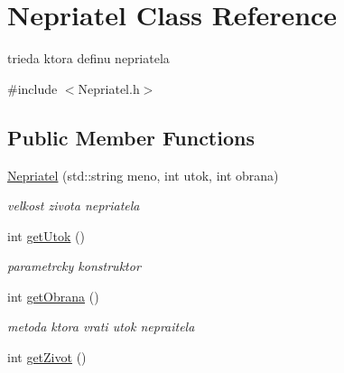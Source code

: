 \hypertarget{class_nepriatel}{\section{Nepriatel Class Reference}
\label{class_nepriatel}
}


trieda ktora definu nepriatela  




{\ttfamily \#include $<$Nepriatel.\-h$>$}

\subsection*{Public Member Functions}
\begin{DoxyCompactItemize}
\item 
\hypertarget{class_nepriatel_ade9716acedbc03f644c5c780ead11de3}{\hyperlink{class_nepriatel_ade9716acedbc03f644c5c780ead11de3}{Nepriatel} (std\-::string meno, int utok, int obrana)}\label{class_nepriatel_ade9716acedbc03f644c5c780ead11de3}

\begin{DoxyCompactList}\small\item\em velkost zivota nepriatela \end{DoxyCompactList}\item 
\hypertarget{class_nepriatel_acc5fcfeffc566856e92a4388b6991c48}{int \hyperlink{class_nepriatel_acc5fcfeffc566856e92a4388b6991c48}{get\-Utok} ()}\label{class_nepriatel_acc5fcfeffc566856e92a4388b6991c48}

\begin{DoxyCompactList}\small\item\em parametrcky konstruktor \end{DoxyCompactList}\item 
\hypertarget{class_nepriatel_a6d2a11c1bc42f268b0ed053039825438}{int \hyperlink{class_nepriatel_a6d2a11c1bc42f268b0ed053039825438}{get\-Obrana} ()}\label{class_nepriatel_a6d2a11c1bc42f268b0ed053039825438}

\begin{DoxyCompactList}\small\item\em metoda ktora vrati utok nepraitela \end{DoxyCompactList}\item 
\hypertarget{class_nepriatel_a2420d033a88248842ea9f272eeb3ee1b}{int \hyperlink{class_nepriatel_a2420d033a88248842ea9f272eeb3ee1b}{get\-Zivot} ()}\label{class_nepriatel_a2420d033a88248842ea9f272eeb3ee1b}


\end{DoxyCompactItemize}
